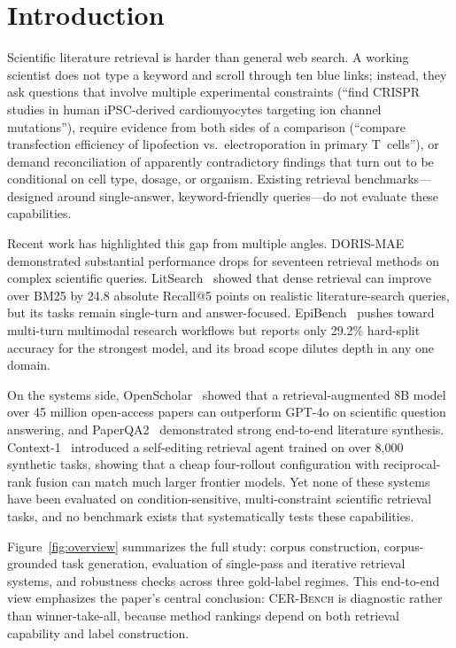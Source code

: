 \documentclass{article}
\begin{document}
\section{Introduction}
\label{sec:intro}

Scientific literature retrieval is harder than general web search. A working scientist does not type a keyword and scroll through ten blue links; instead, they ask questions that involve multiple experimental constraints (``find CRISPR studies in human iPSC-derived cardiomyocytes targeting ion channel mutations''), require evidence from both sides of a comparison (``compare transfection efficiency of lipofection vs.\ electroporation in primary T~cells''), or demand reconciliation of apparently contradictory findings that turn out to be conditional on cell type, dosage, or organism. Existing retrieval benchmarks---designed around single-answer, keyword-friendly queries---do not evaluate these capabilities.

Recent work has highlighted this gap from multiple angles. DORIS-MAE~\cite{dorismae2023} demonstrated substantial performance drops for seventeen retrieval methods on complex scientific queries. LitSearch~\cite{litsearch2024} showed that dense retrieval can improve over BM25 by 24.8 absolute Recall@5 points on realistic literature-search queries, but its tasks remain single-turn and answer-focused. EpiBench~\cite{epibench2026} pushes toward multi-turn multimodal research workflows but reports only 29.2\% hard-split accuracy for the strongest model, and its broad scope dilutes depth in any one domain.

On the systems side, OpenScholar~\cite{openscholar2026} showed that a retrieval-augmented 8B model over 45 million open-access papers can outperform GPT-4o on scientific question answering, and PaperQA2~\cite{skarlinski2024paperqa2} demonstrated strong end-to-end literature synthesis. Context-1~\cite{context2026} introduced a self-editing retrieval agent trained on over 8,000 synthetic tasks, showing that a cheap four-rollout configuration with reciprocal-rank fusion can match much larger frontier models. Yet none of these systems have been evaluated on condition-sensitive, multi-constraint scientific retrieval tasks, and no benchmark exists that systematically tests these capabilities.

Figure~\ref{fig:overview} summarizes the full study: corpus construction, corpus-grounded task generation, evaluation of single-pass and iterative retrieval systems, and robustness checks across three gold-label regimes. This end-to-end view emphasizes the paper's central conclusion: \textsc{CER-Bench} is diagnostic rather than winner-take-all, because method rankings depend on both retrieval capability and label construction.
\end{document}
